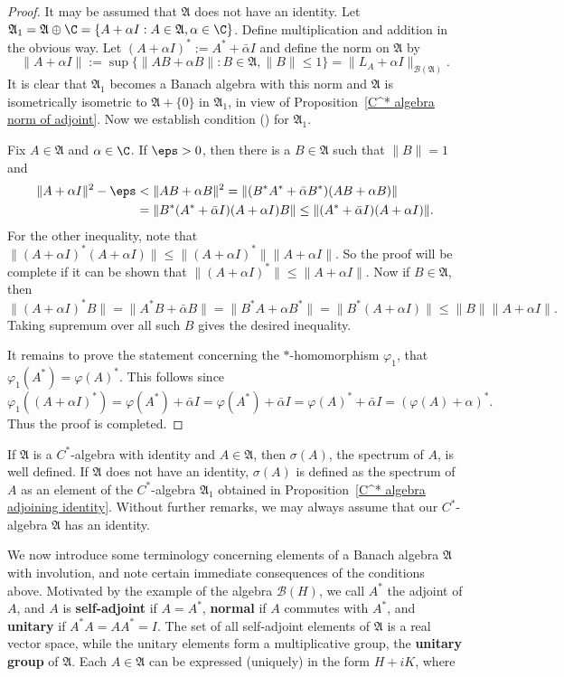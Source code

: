 \begin{proof}
It may be assumed that $\mathfrak{A}$ does not have an identity. Let $\mathfrak{A}_1=\mathfrak{A}\oplus\C=\{A+\alpha I:A\in\mathfrak{A},\alpha\in\C\}$. Define multiplication and addition in the obvious way. Let $(A+\alpha I)^*:=A^*+\bar{\alpha}I$ and define the norm on $\mathfrak{A}$ by
\[\|A+\alpha I\|:=\sup\{\|AB+\alpha B\|:B\in\mathfrak{A},\|B\|\leq 1\}=\|L_A+\alpha I\|_{\mathcal{B}(\mathfrak{A})}.\]
It is clear that $\mathfrak{A}_1$ becomes a Banach algebra with this norm and $\mathfrak{A}$ is isometrically isometric to $\mathfrak{A}+\{0\}$ in $\mathfrak{A}_1$, in view of Proposition~\ref{C^* algebra norm of adjoint}. Now we establish condition () for $\mathfrak{A}_1$.\par
Fix $A\in\mathfrak{A}$ and $\alpha\in\C$. If $\eps>0$, then there is a $B\in\mathfrak{A}$ such that $\|B\|=1$ and
\begin{align*}
\|A+\alpha I\|^2-\eps&<\|AB+\alpha B\|^2=\|(B^*A^*+\bar{\alpha}B^*)(AB+\alpha B)\|\\
&=\|B^*(A^*+\bar{\alpha}I)(A+\alpha I)B\|\leq\|(A^*+\bar{\alpha}I)(A+\alpha I)\|.
\end{align*}
For the other inequality, note that $\|(A+\alpha I)^*(A+\alpha I)\|\leq\|(A+\alpha I)^*\|\|A+\alpha I\|$. So the proof will be complete if it can be shown that $\|(A+\alpha I)^*\|\leq\|A+\alpha I\|$. Now if $B\in\mathfrak{A}$, then
\[\|(A+\alpha I)^*B\|=\|A^*B+\bar{\alpha}B\|=\|B^*A+\alpha B^*\|=\|B^*(A+\alpha I)\|\leq\|B\|\|A+\alpha I\|.\]
Taking supremum over all such $B$ gives the desired inequality.\par
It remains to prove the statement concerning the $*$-homomorphism $\varphi_1$, that $\varphi_1(A^*)=\varphi(A)^*$. This follows since
\[\varphi_1((A+\alpha I)^*)=\varphi(A^*)+\bar{\alpha}I=\varphi(A^*)+\bar{\alpha}I=\varphi(A)^*+\bar{\alpha}I=(\varphi(A)+\alpha)^*.\]
Thus the proof is completed.
\end{proof}
If $\mathfrak{A}$ is a $C^*$-algebra with identity and $A\in\mathfrak{A}$, then $\sigma(A)$, the spectrum of $A$, is well defined. If $\mathfrak{A}$ does not have an identity, $\sigma(A)$ is defined as the spectrum of $A$ as an element of the $C^*$-algebra $\mathfrak{A}_1$ obtained in Proposition~\ref{C^* algebra adjoining identity}. Without further remarks, we may always assume that our $C^*$-algebra $\mathfrak{A}$ has an identity.\par
We now introduce some terminology concerning elements of a Banach algebra $\mathfrak{A}$ with involution, and note certain immediate consequences of the conditions above. Motivated by the example of the algebra $\mathcal{B}(H)$, we call $A^*$ the adjoint of $A$, and $A$ is \textbf{self-adjoint} if $A=A^*$, \textbf{normal} if $A$ commutes with $A^*$, and \textbf{unitary} if $A^*A=AA^*=I$. The set of all self-adjoint elements of $\mathfrak{A}$ is a real vector space, while the unitary elements form a multiplicative group, the \textbf{unitary group} of $\mathfrak{A}$. Each $A\in\mathfrak{A}$ can be expressed (uniquely) in the form $H+iK$, where 
